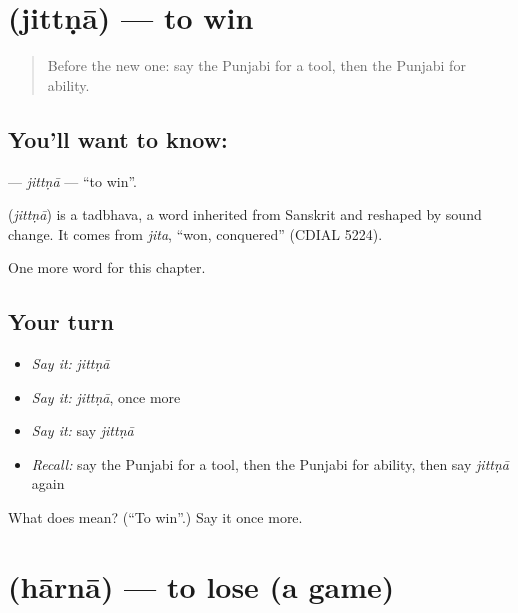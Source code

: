 \section[\texorpdfstring{\pa{ਜਿੱਤਣਾ} (jittṇā)}{ਜਿੱਤਣਾ (jittṇā)}]{ (jittṇā) — to win}

\label{lesson:PA-C112-jittna}



\begin{quote}
Before the new one: say the Punjabi for a tool, then the Punjabi for ability.
\end{quote}

\subsection*{You'll want to know: }
\textbf{} — \emph{jittṇā} — \textquotedblleft{}to win\textquotedblright{}.

\begin{cousinweb}
\textbf{} (\emph{jittṇā}) is a tadbhava, a word inherited from Sanskrit and reshaped by sound change. It comes from \emph{jita}, \textquotedblleft{}won, conquered\textquotedblright{} (CDIAL 5224).
\end{cousinweb}

\begin{grammarlens}[title={What you've built}]
One more word for this chapter.
\end{grammarlens}

\subsection*{Your turn}
\begin{itemize}
\raggedright
  \item \emph{Say it:} \emph{jittṇā}
  \item \emph{Say it:} \emph{jittṇā}, once more
  \item \emph{Say it:} say \emph{jittṇā}
  \item \emph{Recall:} say the Punjabi for a tool, then the Punjabi for ability, then say \emph{jittṇā} again
\end{itemize}

\begin{tcolorbox}[breakable,colback=teal!4,colframe=teal!35!black,title={Before you move on}]
What does  mean? (\textquotedblleft{}To win\textquotedblright{}.) Say it once more.
\end{tcolorbox}
\section[\texorpdfstring{\pa{ਹਾਰਨਾ} (hārnā)}{ਹਾਰਨਾ (hārnā)}]{ (hārnā) — to lose (a game)}

